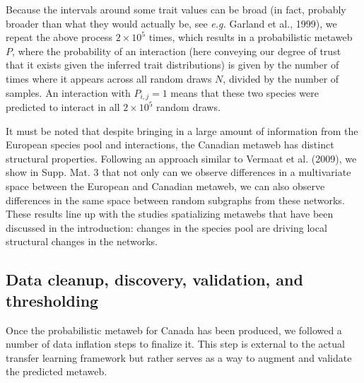 \documentclass[11pt]{article}
\begin{document}
Because the intervals around some trait values can be broad (in fact,
probably broader than what they would actually be, see \emph{e.g.}
Garland et al., 1999), we repeat the above process \(2\times 10^5\)
times, which results in a probabilistic metaweb \(P\), where the
probability of an interaction (here conveying our degree of trust that
it exists given the inferred trait distributions) is given by the number
of times where it appears across all random draws \(N\), divided by the
number of samples. An interaction with \(P_{i,j} = 1\) means that these
two species were predicted to interact in all \(2\times 10^5\) random
draws.

It must be noted that despite bringing in a large amount of information
from the European species pool and interactions, the Canadian metaweb
has distinct structural properties. Following an approach similar to
Vermaat et al. (2009), we show in Supp. Mat. 3 that not only can we
observe differences in a multivariate space between the European and
Canadian metaweb, we can also observe differences in the same space
between random subgraphs from these networks. These results line up with
the studies spatializing metawebs that have been discussed in the
introduction: changes in the species pool are driving local structural
changes in the networks.

\hypertarget{data-cleanup-discovery-validation-and-thresholding}{%
\subsection{Data cleanup, discovery, validation, and
thresholding}\label{data-cleanup-discovery-validation-and-thresholding}}

Once the probabilistic metaweb for Canada has been produced, we followed
a number of data inflation steps to finalize it. This step is external
to the actual transfer learning framework but rather serves as a way to
augment and validate the predicted metaweb.
\end{document}

